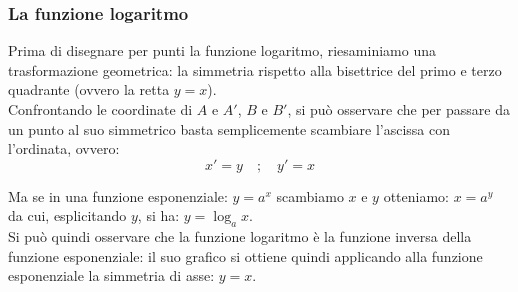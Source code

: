 \subsubsection{La funzione logaritmo}
\label{subsubsec:esplog_funzione_logaritmo}
\noindent
\begin{minipage}[]{.60\textwidth}
Prima di disegnare per punti la funzione logaritmo, riesaminiamo una 
trasformazione geometrica: la simmetria rispetto alla bisettrice del primo 
e terzo quadrante (ovvero
la retta \(y=x\)).\\[7pt]
Confrontando le coordinate di \(A\) e \(A'\), \(B\) e \(B'\), si può 
osservare che per 
passare da un punto al suo simmetrico basta semplicemente scambiare 
l'ascissa 
con l'ordinata, ovvero:
\[ x'=y \quad ; \quad  y'=x\]


\end{minipage} \hspace{.04\textwidth}
\begin{minipage}[]{.35\textwidth}
\begin{center}
\begin{inaccessibleblock}
  \simmetriayx
\end{inaccessibleblock}
\end{center}
\end{minipage} 

\begin{minipage}{.35\textwidth}
\begin{center}
\begin{inaccessibleblock}[Grafico di una funzione esponenziale e 
il suo simmetrico rispetto a y=x]
  \graficologaritmica
\end{inaccessibleblock}
\end{center}
\end{minipage} \qquad
\begin{minipage}{.6\textwidth}
Ma se in una funzione esponenziale: \(y=a^x\) scambiamo \(x\) e \(y\) 
otteniamo: \(x=a^y\) da cui, esplicitando \(y\), si ha: \(y=\log_a 
x\).\\[7pt] Si può quindi 
osservare che la funzione logaritmo è la funzione inversa della funzione 
esponenziale: il suo grafico si ottiene quindi applicando alla funzione 
esponenziale la simmetria di asse: \(y=x\).
\end{minipage}

